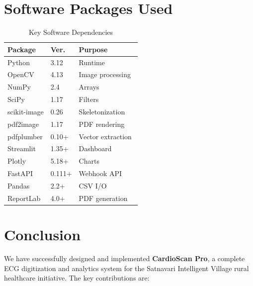 \documentclass[conference]{IEEEtran}
\begin{document}
\section{Software Packages Used}

\begin{table}[!h]
\centering
\caption{Key Software Dependencies}
\label{tab:deps}
\footnotesize
\begin{tabular}{lll}
  \toprule
  \textbf{Package} & \textbf{Ver.} & \textbf{Purpose} \\
  \midrule
  Python       & 3.12   & Runtime \\
  OpenCV       & 4.13   & Image processing~\cite{opencv} \\
  NumPy        & 2.4    & Arrays~\cite{numpy} \\
  SciPy        & 1.17   & Filters~\cite{scipy} \\
  scikit-image & 0.26   & Skeletonization \\
  pdf2image    & 1.17   & PDF rendering \\
  pdfplumber   & 0.10+  & Vector extraction \\
  Streamlit    & 1.35+  & Dashboard \\
  Plotly       & 5.18+  & Charts \\
  FastAPI      & 0.111+ & Webhook API \\
  Pandas       & 2.2+   & CSV I/O \\
  ReportLab    & 4.0+   & PDF generation \\
  \bottomrule
\end{tabular}
\end{table}

\section{Conclusion}

We have successfully designed and implemented \textbf{CardioScan Pro}, a
complete ECG digitization and analytics system for the Satnavari Intelligent
Village rural healthcare initiative. The key contributions are:
\end{document}

